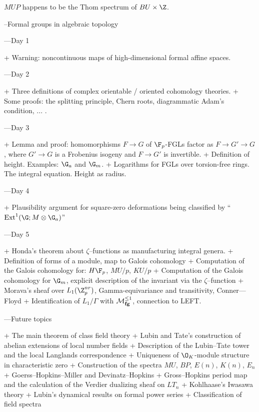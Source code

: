 \documentclass[12pt]{book}
\begin{document}
$MUP$ happens to be the Thom spectrum of $BU \times \Z$.







--Formal groups in algebraic topology

---Day 1

+ Warning: noncontinuous maps of high-dimensional formal affine spaces.

---Day 2

+ Three definitions of complex orientable / oriented cohomology theories.
+ Some proofs: the splitting principle, Chern roots, diagrammatic Adam's condition, ... .

---Day 3

+ Lemma and proof: homomorphisms $F \to G$ of $\F_p$-FGLs factor as $F \to G' \to G$, where $G' \to G$ is a Frobenius isogeny and $F \to G'$ is invertible.
+ Definition of height.  Examples: $\G_a$ and $\G_m$.
+ Logarithms for FGLs over torsion-free rings.  The integral equation.  Height as radius.

---Day 4

+ Plausibility argument for square-zero deformations being classified by ``$\Ext^1(\G; M \otimes \G_a)$''

---Day 5

+ Honda’s theorem about $\zeta$--functions as manufacturing integral genera.
+ Definition of forms of a module, map to Galois cohomology
+ Computation of the Galois cohomology for: $H\F_p$, $MU/p$, $KU/p$
+ Computation of the Galois cohomology for $\G_m$, explicit description of the invariant via the $\zeta$--function
+ Morava’s sheaf over $L_1(\Z_p^{nr})$, Gamma-equivariance and transitivity, Conner—Floyd
+ Identification of $L_1 / \Gamma$ with $\mathcal{M}_{\mathbf{fg}}^{\le 1}$, connection to LEFT.

---Future topics

+ The main theorem of class field theory
+ Lubin and Tate's construction of abelian extensions of local number fields
+ Description of the Lubin--Tate tower and the local Langlands correspondence
+ Uniqueness of $\O_K$-module structure in characteristic zero
+ Construction of the spectra $MU$, $BP$, $E(n)$, $K(n)$, $E_n$
+ Goerss--Hopkins--Miller and Devinatz--Hopkins
+ Gross--Hopkins period map and the calculation of the Verdier dualizing sheaf on $LT_n$
+ Kohlhaase's Iwasawa theory
+ Lubin's dynamical results on formal power series
+ Classification of field spectra
\end{document}
